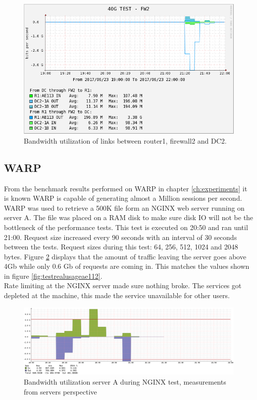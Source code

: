 \begin{figure}
  \includegraphics[scale=0.6]{images/real-ae113.png}
  \caption{Bandwidth utilization of links between router1, firewall2 and DC2.}
  \label{fig:testrealusageae113}
\end{figure}




\subsection{WARP}
From the benchmark results performed on WARP in chapter \ref{ch:experiments} it is known WARP is capable of generating almost a Million sessions per second. WARP was used to retrieve a 500K file form an NGINX web server running on server A.
The file was placed on a RAM disk to make sure disk IO will not be the bottleneck of the performance tests. 
This test is executed on 20:50 and ran until 21:00. Request size increased every 90 seconds with an interval of 30 seconds between the tests.
Request sizes during this test: 64, 256, 512, 1024 and 2048 bytes. 
Figure \ref{fig:realnginx} displays that the amount of traffic leaving the server goes above 4Gb while only 0.6 Gb of requests are coming in. 
This matches the values shown in figure \ref{fig:testrealusageae112}. \\
Rate limiting at the NGINX server made sure nothing broke. The services got depleted at the machine, this made the service unavailable for other users.

\begin{figure}
  \includegraphics[scale=0.35]{images/real-nginx.png}
  \caption{Bandwidth utilization server A during NGINX test, measurements from servers perspective }
  \label{fig:realnginx}
\end{figure}


